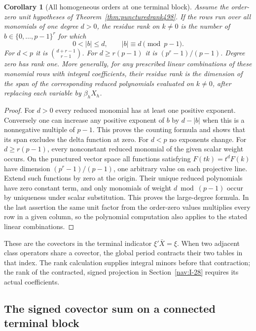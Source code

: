 \documentclass[a4paper,11pt]{article}
\newtheorem{corollary}[proposition]{Corollary}
\theoremstyle{definition}
\theoremstyle{remark}
\numberwithin{equation}{section}
\begin{document}
\begin{corollary}[All homogeneous orders at one terminal block]\leavevmode
\label{cor:homogeneousrank498}
Assume the order-zero unit hypotheses of
Theorem~\ref{thm:puncturedrank498}. If the rows run over all
monomials of one degree \(d>0\), the residue rank on \(k\ne0\)
is the number of \(b\in\{0,\ldots,p-1\}^r\) for which
\[
           0<|b|\le d,\qquad |b|\equiv d\pmod{p-1}.
\]
For \(d<p\) it is \(\binom{d+r-1}{r-1}\). For \(d\ge r(p-1)\)
it is \((p^r-1)/(p-1)\). Degree zero has rank one.
More generally, for any prescribed linear combinations of
these monomial rows with integral coefficients, their residue
rank is the dimension of the span of the corresponding reduced
polynomials evaluated on \(k\ne0\), after replacing each
variable by \(\beta_h X_h\).
\end{corollary}
\begin{proof}
For \(d>0\) every reduced monomial has at least one positive
exponent. Conversely one can increase any positive exponent
of \(b\) by \(d-|b|\) when this is a nonnegative multiple of
\(p-1\). This proves the counting formula and shows that its
span excludes the delta function at zero. For \(d<p\) no
exponents change. For \(d\ge r(p-1)\), every nonconstant
reduced monomial of the given scalar weight occurs. On the
punctured vector space all functions satisfying
\(F(tk)=t^d F(k)\) have dimension \((p^r-1)/(p-1)\), one
arbitrary value on each projective line. Extend such functions
by zero at the origin. Their unique reduced polynomials have
zero constant term, and only monomials of weight \(d\bmod(p-1)\)
occur by uniqueness under scalar substitution. This proves
the large-degree formula. In the last assertion the same unit
factor from the order-zero values multiplies every row in a
given column, so the polynomial computation also applies to
the stated linear combinations.
\end{proof}
These are the covectors in the terminal indicator
\(\xi'\bar X=\xi\). When two adjacent class operators share a
covector, the global period contracts their two tables in that
index. The rank calculation supplies integral minors before that
contraction; the rank of the contracted, signed projection in
Section~\ref{nav:I-28} requires its actual coefficients.


\subsection{The signed covector sum on a connected terminal block}
\label{sec:weylmoments500}
\end{document}
